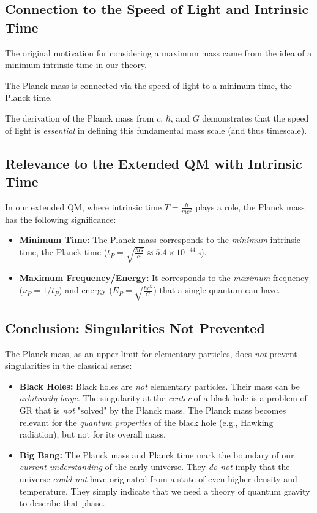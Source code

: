 \documentclass{article}
\begin{document}
\subsection{Connection to the Speed of Light and Intrinsic Time}

The original motivation for considering a maximum mass came from the idea of a minimum intrinsic time in our theory.

The Planck mass is connected via the speed of light to a minimum time, the Planck time.

The derivation of the Planck mass from \(c\), \(\hbar\), and \(G\) demonstrates that the speed of light is \textit{essential} in defining this fundamental mass scale (and thus timescale).

\subsection{Relevance to the Extended QM with Intrinsic Time}

In our extended QM, where intrinsic time \(T = \frac{\hbar}{mc^2}\) plays a role, the Planck mass has the following significance:
\begin{itemize}
	\item \textbf{Minimum Time:} The Planck mass corresponds to the \textit{minimum} intrinsic time, the Planck time (\(t_P = \sqrt{\frac{\hbar G}{c^5}} \approx 5.4 \times 10^{-44} \, \text{s}\)).
	\item \textbf{Maximum Frequency/Energy:} It corresponds to the \textit{maximum} frequency (\(\nu_P = 1/t_P\)) and energy (\(E_P = \sqrt{\frac{\hbar c^5}{G}}\)) that a single quantum can have.
\end{itemize}
	\subsection{Conclusion: Singularities Not Prevented}
	
	The Planck mass, as an upper limit for elementary particles, does \textit{not} prevent singularities in the classical sense:
	\begin{itemize}
\item \textbf{Black Holes:} Black holes are \textit{not} elementary particles. Their mass can be \textit{arbitrarily large}. The singularity at the \textit{center} of a black hole is a problem of GR that is \textit{not} "solved" by the Planck mass. The Planck mass becomes relevant for the \textit{quantum properties} of the black hole (e.g., Hawking radiation), but not for its overall mass.
\item \textbf{Big Bang:} The Planck mass and Planck time mark the boundary of our \textit{current understanding} of the early universe. They \textit{do not} imply that the universe \textit{could not} have originated from a state of even higher density and temperature. They simply indicate that we need a theory of quantum gravity to describe that phase.
\end{itemize}
\end{document}
